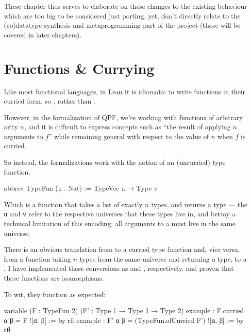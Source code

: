 \documentclass[titlepage]{report}
\begin{document}
These chapter thus serves to elaborate on these changes to the existing behaviour which are too big
to be considered just porting, yet, don't directly relate to the (co)datatype synthesis and metaprogramming
part of the project (those will be covered in later chapters).




\section{Functions \& Currying}
Like most functional languages, in Lean it is idiomatic to write functions in their curried form, 
so , rather than .

However, in the formalization of QPF, we're working with functions of arbitrary arity $n$, and it 
is difficult to express concepts such as ``the result of applying $n$ arguments to $f$'' while remaining
general with respect to the value of $n$ when $f$ is curried.

So instead, the formalizations work with the notion of an (uncurried) type function.

\begin{leancode}
    abbrev TypeFun (n : Nat)
      := TypeVec n → Type v
\end{leancode}

Which is a function that takes a list of exactly $n$ types, and returns a type --- the \texttt{u} and
\texttt{v} refer to the respective universes that these types live in, and betray a technical limitation
of this encoding: all arguments to a  must live in the same universe.

There is an obvious translation from  to a curried type function and, vice versa, from
a function taking $n$ types from the same universe and returning a type, to a .
I have implemented these conversions as  and , respectively,
and proven that these functions are isomorphisms. 

To wit, they function as expected:
\begin{leancode}
    variable (F : TypeFun 2) (F' : Type 1 → Type 1 → Type 2)
    example : F.curried α β = F ![α, β]                 := by rfl
    example : F' α β = (TypeFun.ofCurried F') ![α, β]   := by rfl
\end{leancode}
\end{document}
